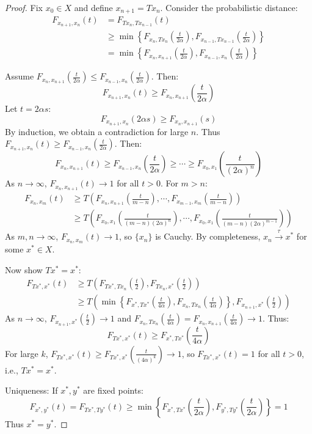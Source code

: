 \documentclass{amsart}
\theoremstyle{definition}
\theoremstyle{remark}
\numberwithin{equation}{section}
\begin{document}
\begin{proof}
Fix $x_0 \in X$ and define $x_{n+1} = Tx_n$. Consider the probabilistic distance:
\begin{align*}
F_{x_{n+1},x_n}(t) &= F_{Tx_n,Tx_{n-1}}(t) \\
&\geq \min\left\{ F_{x_n,Tx_n}\left(\frac{t}{2\alpha}\right), F_{x_{n-1},Tx_{n-1}}\left(\frac{t}{2\alpha}\right) \right\} \\
&= \min\left\{ F_{x_n,x_{n+1}}\left(\frac{t}{2\alpha}\right), F_{x_{n-1},x_n}\left(\frac{t}{2\alpha}\right) \right\}
\end{align*}



Assume $F_{x_n,x_{n+1}}\left(\frac{t}{2\alpha}\right) \leq F_{x_{n-1},x_n}\left(\frac{t}{2\alpha}\right)$. Then:
\[
F_{x_{n+1},x_n}(t) \geq F_{x_n,x_{n+1}}\left(\frac{t}{2\alpha}\right)
\]
Let $t = 2\alpha s$:
\[
F_{x_{n+1},x_n}(2\alpha s) \geq F_{x_n,x_{n+1}}(s)
\]
By induction, we obtain a contradiction for large $n$. Thus $F_{x_{n+1},x_n}(t) \geq F_{x_{n-1},x_n}\left(\frac{t}{2\alpha}\right)$. Then:
\[
F_{x_n,x_{n+1}}(t) \geq F_{x_{n-1},x_n}\left(\frac{t}{2\alpha}\right) \geq \cdots \geq F_{x_0,x_1}\left(\frac{t}{(2\alpha)^n}\right)
\]
As $n \to \infty$, $F_{x_n,x_{n+1}}(t) \to 1$ for all $t > 0$. For $m > n$:
\begin{align*}
F_{x_n,x_m}(t) &\geq T\left(F_{x_n,x_{n+1}}\left(\frac{t}{m-n}\right), \cdots, F_{x_{m-1},x_m}\left(\frac{t}{m-n}\right)\right) \\
&\geq T\left(F_{x_0,x_1}\left(\frac{t}{(m-n)(2\alpha)^n}\right), \cdots, F_{x_0,x_1}\left(\frac{t}{(m-n)(2\alpha)^{m-1}}\right)\right)
\end{align*}
As $m,n \to \infty$, $F_{x_n,x_m}(t) \to 1$, so $\{x_n\}$ is Cauchy. By completeness, $x_n \xrightarrow{\tau} x^*$ for some $x^* \in X$.

Now show $Tx^* = x^*$:
\begin{align*}
F_{Tx^*,x^*}(t) &\geq T\left(F_{Tx^*,Tx_n}\left(\frac{t}{2}\right), F_{Tx_n,x^*}\left(\frac{t}{2}\right)\right) \\
&\geq T\left(\min\left\{F_{x^*,Tx^*}\left(\frac{t}{4\alpha}\right), F_{x_n,Tx_n}\left(\frac{t}{4\alpha}\right)\right\}, F_{x_{n+1},x^*}\left(\frac{t}{2}\right)\right)
\end{align*}
As $n \to \infty$, $F_{x_{n+1},x^*}\left(\frac{t}{2}\right) \to 1$ and $F_{x_n,Tx_n}\left(\frac{t}{4\alpha}\right) = F_{x_n,x_{n+1}}\left(\frac{t}{4\alpha}\right) \to 1$. Thus:
\[
F_{Tx^*,x^*}(t) \geq F_{x^*,Tx^*}\left(\frac{t}{4\alpha}\right)
\]
For large $k$, $F_{Tx^*,x^*}(t) \geq F_{Tx^*,x^*}\left(\frac{t}{(4\alpha)^k}\right) \to 1$, so $F_{Tx^*,x^*}(t) = 1$ for all $t > 0$, i.e., $Tx^* = x^*$.

Uniqueness: If $x^*, y^*$ are fixed points:
\[
F_{x^*,y^*}(t) = F_{Tx^*,Ty^*}(t) \geq \min\left\{F_{x^*,Tx^*}\left(\frac{t}{2\alpha}\right), F_{y^*,Ty^*}\left(\frac{t}{2\alpha}\right)\right\} = 1
\]
Thus $x^* = y^*$.
\end{proof}
\end{document}
